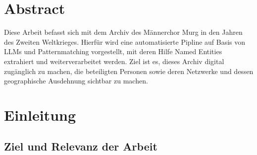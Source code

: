 \documentclass[12pt, a4paper, ngerman, bidi=default]{article}
\renewcommand*\contentsname{Inhaltsverzeichnis}
\newcommand\contentsname{Inhaltsverzeichnis}
\begin{document}
\pagecolor{white}  
\color{black}  %
\section*{Abstract}

Diese Arbeit befasst sich mit dem Archiv des Männerchor Murg in den Jahren des Zweiten Weltkrieges. 
Hierfür wird eine automatisierte Pipline auf Basis von LLMs und Patternmatching vorgestellt, mit deren Hilfe Named Entities extrahiert und weiterverarbeitet werden. 
Ziel ist es, dieses Archiv digital zugänglich zu machen, die beteiligten Personen sowie deren Netzwerke und dessen geographische Ausdehnung sichtbar zu machen.

\newpage




\renewcommand*\contentsname{Inhaltsverzeichnis} %
{
\hypersetup{linkcolor=}
\setcounter{tocdepth}{5} %
\tableofcontents
}
\newpage
{} %



\section{Einleitung}
\subsection{Ziel und Relevanz der Arbeit}
\end{document}
